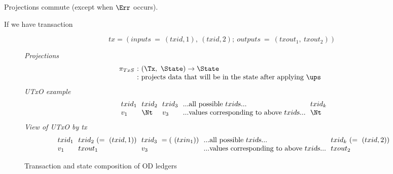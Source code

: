 Projections commute (except when $\Err$ occurs).

%
%
%

If we have transaction

\[ tx = (inputs~=~(txid, 1),~(txid, 2);~outputs~=~(txout_1,~txout_2)) \]

\begin{figure*}[htb]
  \emph{Projections}
  \begin{equation*}
    \begin{array}{l@{~:~}l@{~~}ll}
    \pi_{TxS} & (\Tx,~\State) \to \State  \\
    & \text{projects data that will be in the state after applying $\ups$ }
    \end{array}
  \end{equation*}
  \emph{UTxO example}
  \begin{equation*}
    \begin{array}{l@{~~}l@{~~}l@{~~}l@{~~}l@{~~}l@{~~}l@{~~}l@{~~}l}
      & txid_1 & txid_2 & txid_3 & ...\text{all possible $txid$s}... & txid_k   \\
      & v_1 & \Nt & v_3 & ...\text{values corresponding to above $txid$s}... & \Nt   \\
    \end{array}
  \end{equation*}
  \emph{View of UTxO by tx}
  \begin{equation*}
    \begin{array}{l@{~~}l@{~~}l@{~~}l@{~~}l@{~~}l@{~~}l@{~~}l@{~~}l}
    & txid_1 & txid_2~(=~(txid, 1)) & txid_3~=(~(txin_1)) & ...\text{all possible $txid$s}... & txid_k~(=~(txid, 2))   \\
    & v_1 & txout_1 & v_3 & ...\text{values corresponding to above $txid$s}... & txout_2
    \end{array}
  \end{equation*}
  \caption{Transaction and state composition of OD ledgers}
  \label{fig:ud-comp}
\end{figure*}
